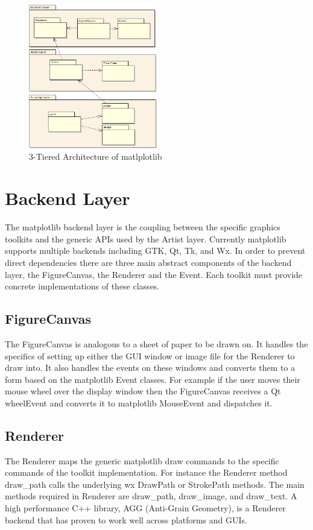 \documentclass[pdftex,10pt,a4paper]{report}
\begin{document}
\begin{figure}[ht!]
        \centering
                \includegraphics[width=0.5\textwidth]{img/umls/arch/threeTierArch.jpg}
        \caption{3-Tiered Architecture of matlplotlib}\label{fig:threeTier}
\end{figure}

\section{Backend Layer}

The matplotlib backend layer is the coupling between the specific graphics toolkits and the generic APIs used by the Artist layer. Currently matplotlib supports multiple backends including GTK, Qt, Tk, and Wx. In order to prevent direct dependencies there are three main abstract components of the backend layer, the FigureCanvas, the Renderer and the Event. Each toolkit must provide concrete implementations of these classes.

\subsection{FigureCanvas}

The FigureCanvas is analogous to a sheet of paper to be drawn on. It handles the specifics of setting up either the GUI window or image file for the Renderer to draw into. It also handles the events on these windows and converts them to a form based on the matplotlib Event classes. For example if the user moves their mouse wheel over the display window then the FigureCanvas receives a Qt wheelEvent and converts it to matplotlib MouseEvent and dispatches it.

\subsection{Renderer}
The Renderer maps the generic matplotlib draw commands to the specific commands of the toolkit implementation. For instance the Renderer method draw\_path calls the underlying wx DrawPath or StrokePath methods. The main methods required in Renderer are draw\_path, draw\_image, and draw\_text. A high performance C++ library, AGG (Anti-Grain Geometry), is a Renderer backend that has proven to work well across platforms and GUIs.
\end{document}
